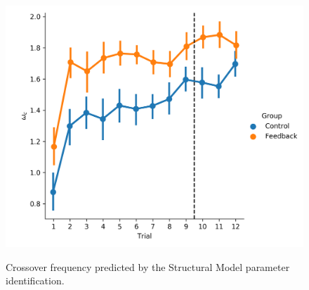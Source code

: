 




\begin{figure}[t]
    \centering
    \centering
    \includegraphics[width=0.8\linewidth]{figures/Modeling/wc_group.png}
    \label{fig:sm_crossover}
    \caption[Crossover frequency (Structural Model)]{Crossover frequency predicted by the Structural Model parameter identification.}
\end{figure}

